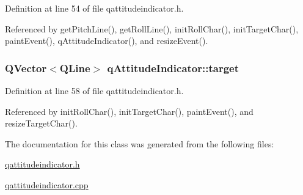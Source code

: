 Definition at line 54 of file qattitudeindicator.\-h.



Referenced by get\-Pitch\-Line(), get\-Roll\-Line(), init\-Roll\-Char(), init\-Target\-Char(), paint\-Event(), q\-Attitude\-Indicator(), and resize\-Event().

\hypertarget{classqAttitudeIndicator_a7f5a24dd1bf00a9e81d2aeb0ac83359e}{
\subsubsection[{target}]{\setlength{\rightskip}{0pt plus 5cm}Q\-Vector$<$Q\-Line$>$ q\-Attitude\-Indicator\-::target\hspace{0.3cm}{\ttfamily [private]}}}\label{classqAttitudeIndicator_a7f5a24dd1bf00a9e81d2aeb0ac83359e}


Definition at line 58 of file qattitudeindicator.\-h.



Referenced by init\-Roll\-Char(), init\-Target\-Char(), paint\-Event(), and resize\-Target\-Char().



The documentation for this class was generated from the following files\-:\begin{DoxyCompactItemize}
\item 
\hyperlink{qattitudeindicator_8h}{qattitudeindicator.\-h}\item 
\hyperlink{qattitudeindicator_8cpp}{qattitudeindicator.\-cpp}\end{DoxyCompactItemize}
